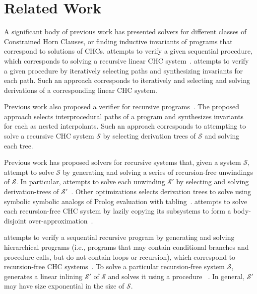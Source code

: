 \section{Related Work}
\label{sec:related-work}
A significant body of previous work has presented solvers for
different classes of Constrained Horn Clauses, or finding inductive
invariants of programs that correspond to solutions of CHCs.
\impact attempts to verify a given sequential procedure, which
corresponds to solving a recursive linear CHC
system~\cite{mcmillan06}.
%
\impact attempts to verify a given procedure by iteratively selecting
paths and synthesizing invariants for each path.
%
Such an approach corresponds to iteratively and selecting and solving
derivations of a corresponding linear CHC system.

Previous work also proposed a verifier for recursive
programs~\cite{heizmann10}.
%
The proposed approach selects interprocedural paths of a program and
synthesizes invariants for each as nested interpolants.
%
Such an approach corresponds to attempting to solve a recursive CHC
system $\mathcal{S}$ by selecting derivation trees of $\mathcal{S}$
and solving each tree.

Previous work has proposed solvers for recursive systems that, given a
system $\mathcal{S}$, attempt to solve $\mathcal{S}$ by generating and
solving a series of recursion-free unwindings of $\mathcal{S}$.
%
In particular, \duality attempts to solve each unwinding
$\mathcal{S}'$ by selecting and solving derivation-trees of
$\mathcal{S}'$~\cite{bjorner13}.
%
Other optimizations selects derivation trees to solve using symbolic
symbolic analogs of Prolog evaluation with
tabling~\cite{jaffar09,mcmillan14}.
%
\eldarica attempts to solve each recursion-free CHC system by lazily
copying its subsystems to form a body-disjoint
over-approximation~\cite{rummer13a,rummer13b}.

\whale attempts to verify a sequential recursive program by generating
and solving hierarchical programs (i.e., programs that may contain
conditional branches and procedure calls, but do not contain loops or
recursion), which correspond to recursion-free CHC
systems~\cite{albarghouthi12b}.
%
To solve a particular recursion-free system $\mathcal{S}$, \whale
generates a linear inlining $\mathcal{S}'$ of $\mathcal{S}$ and solves
it using a procedure \vinta~\cite{albarghouthi12a}.
%
In general, $\mathcal{S}'$ may have size exponential in the size of
$\mathcal{S}$.

